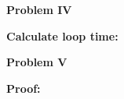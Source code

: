 \documentclass[12pt]{article}
\begin{document}
\par
\bigskip
{\bf Problem
IV
}
\par
\bigskip
{\bf Calculate loop time:}
\par


\par

\par
\bigskip
{\bf Problem
V
}
\par
\bigskip
{\bf Proof:}
\par


\par


\end{document}
